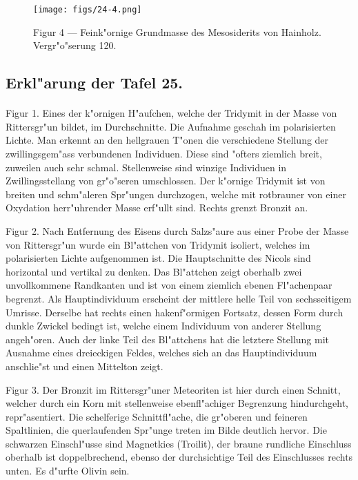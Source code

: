 \documentclass[a4paper, 11pt, oneside, polutonikogreek, german]{article}
\begin{document}
\vspace*{\fill}
\begin{figure}[H]
\centering
\texttt{[image: figs/24-4.png]}
\caption{\small Figur 4 --- Feink"ornige Grundmasse des Mesosiderits von Hainholz. Vergr"o"serung 120.}
\end{figure}
\vspace*{\fill}
\clearpage

\subsection{Erkl"arung der Tafel 25.}
\paragraph{}
Figur 1. Eines der k"ornigen H"aufchen, welche der Tridymit in der Masse von Rittersgr"un bildet, im Durchschnitte. Die Aufnahme geschah im polarisierten Lichte. Man erkennt an den hellgrauen T"onen die verschiedene Stellung der zwillingsgem"ass verbundenen Individuen. Diese sind "ofters ziemlich breit, zuweilen auch sehr schmal. Stellenweise sind winzige Individuen in Zwillingsstellang von gr"o"seren umschlossen. Der k"ornige Tridymit ist von breiten und schm"aleren Spr"ungen durchzogen, welche mit rotbrauner von einer Oxydation herr"uhrender Masse erf"ullt sind. Rechts grenzt Bronzit an.

Figur 2. Nach Entfernung des Eisens durch Salzs"aure aus einer Probe der Masse von Rittersgr"un wurde ein Bl"attchen von Tridymit isoliert, welches im polarisierten Lichte aufgenommen ist. Die Hauptschnitte des Nicols sind horizontal und vertikal zu denken. Das Bl"attchen zeigt oberhalb zwei unvollkommene Randkanten und ist von einem ziemlich ebenen Fl"achenpaar begrenzt. Als Hauptindividuum erscheint der mittlere helle Teil von sechsseitigem Umrisse. Derselbe hat rechts einen hakenf"ormigen Fortsatz, dessen Form durch dunkle Zwickel bedingt ist, welche einem Individuum von anderer Stellung angeh"oren. Auch der linke Teil des Bl"attchens hat die letztere Stellung mit Ausnahme eines dreieckigen Feldes, welches sich an das Hauptindividuum anschlie"st und einen Mittelton zeigt.

Figur 3. Der Bronzit im Rittersgr"uner Meteoriten ist hier durch einen Schnitt, welcher durch ein Korn mit stellenweise ebenfl"achiger Begrenzung hindurchgeht, repr"asentiert. Die schelferige Schnittfl"ache, die gr"oberen und feineren Spaltlinien, die querlaufenden Spr"unge treten im Bilde deutlich hervor. Die schwarzen Einschl"usse sind Magnetkies (Troilit), der braune rundliche Einschluss oberhalb ist doppelbrechend, ebenso der durchsichtige Teil des Einschlusses rechts unten. Es d"urfte Olivin sein.
\end{document}
